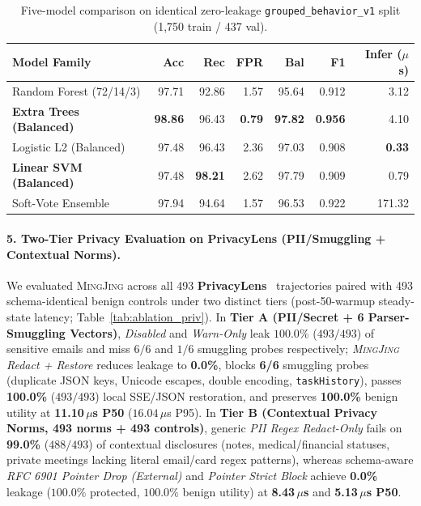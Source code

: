 \documentclass[10pt,twocolumn,letterpaper]{article}
\newcommand{\sys}{\textsc{MingJing}}
\newcommand{\code}[1]{\texttt{\small #1}}
\begin{document}
\begin{table}[t]
\centering
\scriptsize
\setlength{\tabcolsep}{1.8pt}
\caption{Five-model comparison on identical zero-leakage \code{grouped\_behavior\_v1} split (1,750 train / 437 val).}
\label{tab:ablation_multimodel}
\begin{tabular}{@{}lrrrrrr@{}}
\toprule
\textbf{Model Family} & \textbf{Acc} & \textbf{Rec} & \textbf{FPR} & \textbf{Bal} & \textbf{F1} & \textbf{Infer ($\mu$s)} \\
\midrule
Random Forest (72/14/3)         & 97.71 & 92.86 & 1.57 & 95.64 & 0.912 & 3.12 \\
\textbf{Extra Trees (Balanced)} & \textbf{98.86} & 96.43 & \textbf{0.79} & \textbf{97.82} & \textbf{0.956} & 4.10 \\
Logistic L2 (Balanced)          & 97.48 & 96.43 & 2.36 & 97.03 & 0.908 & \textbf{0.33} \\
\textbf{Linear SVM (Balanced)}  & 97.48 & \textbf{98.21} & 2.62 & 97.79 & 0.909 & 0.79 \\
Soft-Vote Ensemble              & 97.94 & 94.64 & 1.57 & 96.53 & 0.922 & 171.32 \\
\bottomrule
\end{tabular}
\end{table}

\paragraph{5. Two-Tier Privacy Evaluation on PrivacyLens (PII/Smuggling + Contextual Norms).}
We evaluated \sys{} across all 493 \textbf{PrivacyLens}~\cite{privacylens2024} trajectories paired with 493 schema-identical benign controls under two distinct tiers (post-50-warmup steady-state latency; Table~\ref{tab:ablation_priv}). In \textbf{Tier A (PII/Secret + 6 Parser-Smuggling Vectors)}, \emph{Disabled} and \emph{Warn-Only} leak $100.0\%$ ($493/493$) of sensitive emails and miss $6/6$ and $1/6$ smuggling probes respectively; \emph{\sys{} Redact + Restore} reduces leakage to \textbf{0.0\%}, blocks \textbf{6/6} smuggling probes (duplicate JSON keys, Unicode escapes, double encoding, \code{taskHistory}), passes \textbf{100.0\%} ($493/493$) local SSE/JSON restoration, and preserves \textbf{100.0\%} benign utility at \textbf{11.10\,$\mu$s P50} ($16.04\,\mu$s P95). In \textbf{Tier B (Contextual Privacy Norms, 493 norms + 493 controls)}, generic \emph{PII Regex Redact-Only} fails on \textbf{99.0\%} ($488/493$) of contextual disclosures (notes, medical/financial statuses, private meetings lacking literal email/card regex patterns), whereas schema-aware \emph{RFC 6901 Pointer Drop (External)} and \emph{Pointer Strict Block} achieve \textbf{0.0\%} leakage ($100.0\%$ protected, $100.0\%$ benign utility) at \textbf{8.43\,$\mu$s} and \textbf{5.13\,$\mu$s P50}.
\end{document}
